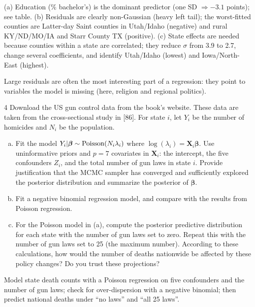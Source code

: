 \documentclass[11pt]{article}
\begin{document}
\begin{answer}
(a) Education (\% bachelor's) is the dominant predictor (one SD $\Rightarrow-3.1$ points); see table. (b) Residuals are clearly non-Gaussian (heavy left tail); the worst-fitted counties are Latter-day Saint counties in Utah/Idaho (negative) and rural KY/ND/MO/IA and Starr County TX (positive). (c) State effects are needed because counties within a state are correlated; they reduce $\sigma$ from 3.9 to 2.7, change several coefficients, and identify Utah/Idaho (lowest) and Iowa/North-East (highest).
\end{answer}

\begin{takeaway}
Large residuals are often the most interesting part of a regression: they point to variables the model is missing (here, religion and regional politics).
\end{takeaway}


\begin{problem}{4}
Download the US gun control data from the book's website. These data are taken from the cross-sectional study in [86]. For state $i$, let $Y_i$ be the number of homicides and $N_i$ be the population.
\begin{enumerate}[(a)]
\item Fit the model $Y_i|\bm\beta\sim\mathrm{Poisson}(N_i\lambda_i)$ where $\log(\lambda_i)=\mathbf X_i\bm\beta$. Use uninformative priors and $p=7$ covariates in $\mathbf X_i$: the intercept, the five confounders $Z_i$, and the total number of gun laws in state $i$. Provide justification that the MCMC sampler has converged and sufficiently explored the posterior distribution and summarize the posterior of $\bm\beta$.
\item Fit a negative binomial regression model, and compare with the results from Poisson regression.
\item For the Poisson model in (a), compute the posterior predictive distribution for each state with the number of gun laws set to zero. Repeat this with the number of gun laws set to 25 (the maximum number). According to these calculations, how would the number of deaths nationwide be affected by these policy changes? Do you trust these projections?
\end{enumerate}
\end{problem}

\begin{restate}
Model state death counts with a Poisson regression on five confounders and the number of gun laws; check for over-dispersion with a negative binomial; then predict national deaths under ``no laws'' and ``all 25 laws''.
\end{restate}
\end{document}
